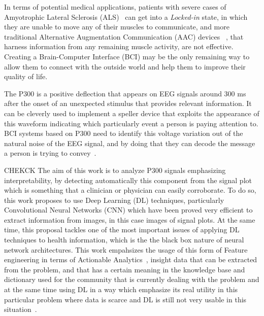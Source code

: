 \documentclass[conference]{IEEEtran}
\begin{document}
In terms of potential medical applications, patients with severe cases of Amyotrophic Lateral Sclerosis (ALS)~\cite{Pugliese.etal2022} can get into a \textit{Locked-in} state, in which they are unable to move any of their muscles to communicate, and more traditional Alternative Augmentation Communication (AAC) devices ~\cite{Masiello.2022}, that harness information from any remaining muscle activity, are not effective. Creating a Brain-Computer Interface (BCI) may be the only remaining way to allow them to connect with the outside world and help them to improve their quality of life\cite{vucic.2021,GUY20185}.  


The P300 is a positive deflection that appears on EEG signals around 300 ms after the onset of an unexpected stimulus that provides relevant information. It can be cleverly used to implement a speller device that exploits the appearance of this waveform indicating which particularly event a person is paying attention to.  BCI systems based on P300 need to identify this voltage variation out of the natural noise of the EEG signal, and by doing that they can decode the message a person is trying to convey~\cite{Antonietti.etal2021,Orhanbulucu.etal2022}.

CHEKCK The aim of this work is to analyze P300 signals emphasizing interpretability, by detecting automatically this component from the signal plot which is something that a clinician or physician can easily corroborate.  To do so, this work proposes to use Deep Learning (DL) techniques, particularly Convolutional Neural Networks (CNN) which have been proved very efficient to extract information from images, in this case images of signal plots.  At the same time, this proposal tackles one of the most important issues of applying DL techniques to health information, which is the the black box nature of neural network architectures. This work empahsizes the usage of this form of Feature engineering in terms of Actionable Analytics~\cite{Ganapathy.etal2018}, insight data that can be extracted from the problem, and that has a certain meaning in the knowledge base and dictionary used for the community that is currently dealing with the problem and at the same time using DL in a way which emphasize its real utility in this particular problem where data is scarce and DL is still not very usable in this situation~\cite{Sterniuk.etal2021}.
\end{document}
